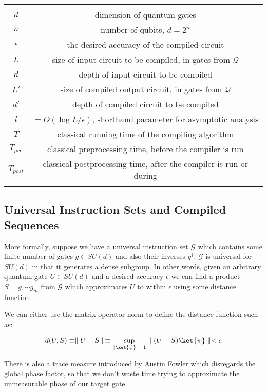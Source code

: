 \documentclass{article}
\theoremstyle{plain}
\begin{document}
\begin{tabular}{|c|c|}
\hline\\
$d$ & dimension of quantum gates\\
$n$ & number of qubits, $d=2^n$\\
$\epsilon$ & the desired accuracy of the compiled circuit\\
$L$ & size of input circuit to be compiled, in gates from $\mathcal{Q}$\\
$d$ & depth of input circuit to be compiled\\
$L'$ & size of compiled output circuit, in gates from $\mathcal{Q}$\\
$d'$ & depth of compiled circuit to be compiled\\
$l$ & $=O(\log{L/\epsilon})$, shorthand parameter for asymptotic analysis\\
$T$ & classical running time of the compiling algorithm\\
$T_{pre}$ & classical preprocessing time, before the compiler is run\\
$T_{post}$ & classical postprocessing time, after the compiler is run or during\\
\hline\\
\end{tabular}

\subsection{Universal Instruction Sets and Compiled Sequences}
More formally, suppose we have a universal instruction set $\mathcal{G}$ which
contains some finite number of gates $g \in SU(d)$ and also their inverses $g^\dagger$.
$\mathcal{G}$ is universal for $SU(d)$ in that it generates a dense subgroup.
In other words, given an arbitrary quantum gate $U \in SU(d)$ and a desired
accuracy $\epsilon$ we can find a product $S=g_1 \cdots g_m$ from $\mathcal{G}$
which approximates $U$ to within $\epsilon$ using some distance function.

We can either use the matrix operator norm to define the distance function
such as:

\begin{equation}
d(U,S) \equiv \norm{U - S} \equiv \sup_{\norm{\ket{\psi}}=1} \norm{(U-S)\ket{\psi}} < \epsilon
\end{equation}

There is also a trace measure introduced by Austin Fowler which disregards
the global phase factor, so that we don't waste time trying to approximate
the unmeasurable phase of our target gate.
\end{document}
